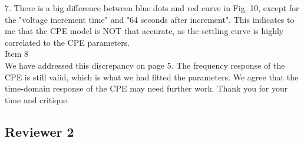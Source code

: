 \documentclass[journal, a4paper]{IEEEtran}
\begin{document}
{7. There is a big difference between blue dots and red curve in Fig. 10, except for the "voltage increment time" and "64 seconds after increment".  This indicates to me that the CPE model is NOT that accurate, as the settling curve is highly correlated to the CPE parameters.\\
{\color{OliveGreen}
    Item 8\\
    We have addressed this discrepancy on page 5. The frequency response of the CPE is still valid, which is what we had fitted the parameters. We agree that the time-domain response of the CPE may need further work. Thank you for your time and critique. 
}\\
}

\subsection*{Reviewer 2}
\end{document}
